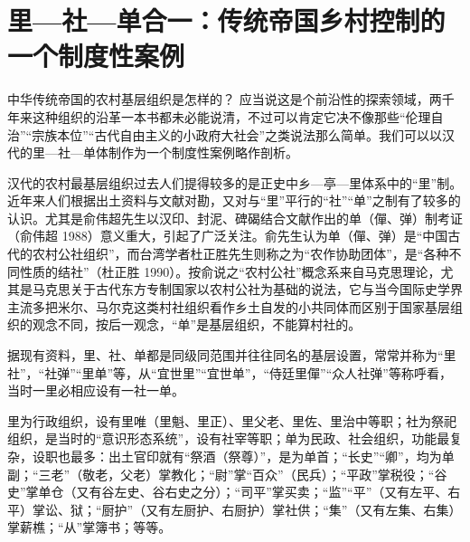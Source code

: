 \documentclass[a4paper,12pt,punct=kaiming]{ctexart}
\begin{document}
\section*{里—社—单合一：传统帝国乡村控制的一个制度性案例}

中华传统帝国的农村基层组织是怎样的？ 应当说这是个前沿性的探索领域，两千年来这种组织的沿革一本书都未必能说清，不过可以肯定它决不像那些“伦理自治”“宗族本位”“古代自由主义的小政府大社会”之类说法那么简单。我们可以以汉代的里—社—单体制作为一个制度性案例略作剖析。

汉代的农村最基层组织过去人们提得较多的是正史中乡—亭—里体系中的“里”制。近年来人们根据出土资料与文献对勘，又对与“里”平行的“社”“单”之制有了较多的认识。尤其是俞伟超先生以汉印、封泥、碑碣结合文献作出的单（僤、弹）制考证（俞伟超 1988）意义重大，引起了广泛关注。俞先生认为单（僤、弹）是“中国古代的农村公社组织”，而台湾学者杜正胜先生则称之为“农作协助团体”，是“各种不同性质的结社”（杜正胜 1990）。按俞说之“农村公社”概念系来自马克思理论，尤其是马克思关于古代东方专制国家以农村公社为基础的说法，它与当今国际史学界主流多把米尔、马尔克这类村社组织看作乡土自发的小共同体而区别于国家基层组织的观念不同，按后一观念，“单”是基层组织，不能算村社的。

据现有资料，里、社、单都是同级同范围并往往同名的基层设置，常常并称为“里社”，“社弹”“里单”等，从“宜世里”“宜世单”，“侍廷里僤”“众人社弹”等称呼看，当时一里必相应设有一社一单。

里为行政组织，设有里唯（里魁、里正）、里父老、里佐、里治中等职；社为祭祀组织，是当时的“意识形态系统”，设有社宰等职；单为民政、社会组织，功能最复杂，设职也最多：出土官印就有“祭酒（祭尊）”，是为单首；“长史”“卿”，均为单副；“三老”（敬老，父老）掌教化；“尉”掌“百众”（民兵）；“平政”掌税役；“谷史”掌单仓（又有谷左史、谷右史之分）；“司平”掌买卖；“监”“平”（又有左平、右平）掌讼、狱；“厨护”（又有左厨护、右厨护）掌社供；“集”（又有左集、右集）掌薪樵；“从”掌簿书；等等。
\end{document}
